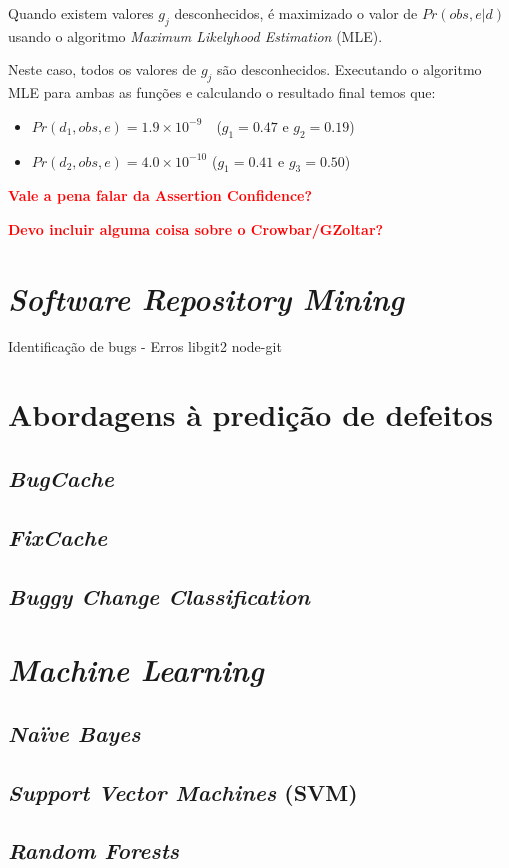 Quando existem valores $g_j$ desconhecidos, é maximizado o valor de $Pr(obs, e | d)$ usando o algoritmo \emph{Maximum Likelyhood Estimation} (MLE).

Neste caso, todos os valores de $g_j$ são desconhecidos. Executando o algoritmo MLE para ambas as funções e calculando o resultado final temos que:
%
\begin{itemize}
\item $Pr(d_1, obs, e) = 1.9 \times 10^{-9}$\ \ ($g_1 = 0.47$ e $g_2 = 0.19$)
\item $Pr(d_2, obs, e) = 4.0 \times 10^{-10}$ ($g_1 = 0.41$ e $g_3 = 0.50$)
\end{itemize}

\textbf{\textcolor{red}{Vale a pena falar da Assertion Confidence?} }


% 
%

\textbf{\textcolor{red}{Devo incluir alguma coisa sobre o Crowbar/GZoltar?} }

\section{\emph{Software Repository Mining}}

Identificação de bugs - Erros
libgit2
node-git

\section{Abordagens à predição de defeitos}

\subsection{\emph{BugCache}}

\subsection{\emph{FixCache}}

\subsection{\emph{Buggy Change Classification}}


\section{\emph{Machine Learning}}

\subsection{\emph{Naïve Bayes}}

\subsection{\emph{Support Vector Machines} (SVM)}

\subsection{\emph{Random Forests}}



